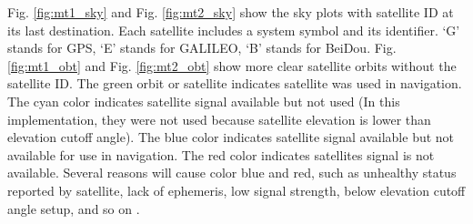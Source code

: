 \documentclass[letterpaper, 10 pt,onecolumn]{article}
\begin{document}
	Fig. \ref{fig:mt1_sky} and Fig. \ref{fig:mt2_sky} show the sky plots with satellite ID at its last destination. Each satellite includes a system symbol and its identifier. `G' stands for GPS, `E' stands for GALILEO, `B' stands for BeiDou. Fig. \ref{fig:mt1_obt} and Fig. \ref{fig:mt2_obt} show more clear satellite orbits without the satellite ID. The green orbit or satellite indicates satellite was used in navigation. The cyan color indicates satellite signal available but not used (In this implementation, they were not used because satellite elevation is lower than elevation cutoff angle). The blue color indicates satellite signal available but not available for use in navigation. The red color indicates satellites signal is not available. Several reasons will cause color blue and red, such as unhealthy status reported by satellite, lack of ephemeris, low signal strength, below elevation cutoff angle setup, and so on \cite{ucenter}. 
	
\end{document}
